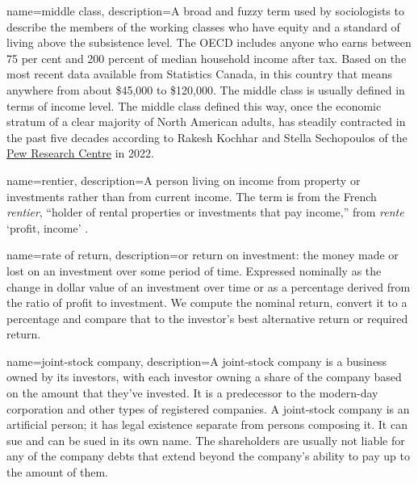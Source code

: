 {
name=middle class,
description={A broad and fuzzy term used by sociologists to describe the members of the working classes who have equity and a standard of living above the subsistence level. The OECD includes anyone who earns between 75 per cent and 200 percent of median household income after tax. Based on the most recent data available from Statistics Canada, in this country that means anywhere from about \$45,000 to \$120,000. The middle class is usually defined in terms of income level. The middle class defined this way, once the economic stratum of a clear majority of North American adults, has steadily contracted in the past five decades according to
Rakesh Kochhar and  Stella Sechopoulos of the \href{https://www.pewresearch.org/fact-tank/2022/04/20/how-the-american-middle-class-has-changed-in-the-past-five-decades/}{Pew Research Centre}  in 2022.}
}

{
name=rentier,
description={A person living on income from property or investments rather than from current income. The term is from the  French \textit{rentier}, ``holder of rental properties or investments that pay income,'' from \textit{rente} `profit, income' \cite{GET_rentier_defn_quote}. %
}
}

{
name=rate of return,
description={or return on investment: the money made or lost on an investment over some period of time. Expressed nominally as the change in dollar value of an investment over time or  as a percentage derived from the ratio of profit to investment. We compute the nominal return, convert it to a percentage and compare that to the investor's best alternative return or required return.}
}

{
name=joint-stock company,
description={A joint-stock company is a business owned by its investors, with each investor owning a share of the company based on the amount that they've invested. It is a predecessor to the modern-day corporation and other types of registered companies. A joint-stock company is an artificial person; it has legal existence separate from persons composing it. It can sue and can be sued in its own name. The shareholders are usually not liable for any of the company debts that extend beyond the company's ability to pay up to the amount of them.}
}

